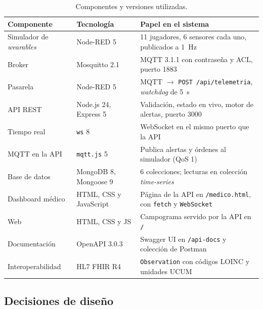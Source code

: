 \documentclass[runningheads]{llncs}
\begin{document}
\begin{table}[!htbp]
\centering
\caption{Componentes y versiones utilizadas.}\label{tab:tecnologias}
\footnotesize
\begin{tabularx}{\textwidth}{p{3.2cm}p{2.6cm}L}
\toprule
\textbf{Componente} & \textbf{Tecnología} & \textbf{Papel en el sistema} \\
\midrule
Simulador de \emph{wearables} & Node-RED 5 & 11 jugadores, 6 sensores cada uno, publicados a 1~Hz \\
Broker & Mosquitto 2.1 & MQTT 3.1.1 con contraseña y ACL, puerto 1883 \\
Pasarela & Node-RED 5 & MQTT $\rightarrow$ \texttt{POST /api/telemetria}, \emph{watchdog} de 5~s \\
API REST & Node.js 24, Express 5 & Validación, estado en vivo, motor de alertas, puerto 3000 \\
Tiempo real & \texttt{ws} 8 & WebSocket en el mismo puerto que la API \\
MQTT en la API & \texttt{mqtt.js} 5 & Publica alertas y órdenes al simulador (QoS 1) \\
Base de datos & MongoDB 8, Mongoose 9 & 6 colecciones; lecturas en colección \emph{time-series} \\
Dashboard médico & HTML, CSS y JavaScript & Página de la API en \texttt{/medico.html}, con \texttt{fetch} y \texttt{WebSocket} \\
Web & HTML, CSS y JS & Campograma servido por la API en \texttt{/} \\
Documentación & OpenAPI 3.0.3 & Swagger UI en \texttt{/api-docs} y colección de Postman \\
Interoperabilidad & HL7 FHIR R4 & \texttt{Observation} con códigos LOINC y unidades UCUM \\
\bottomrule
\end{tabularx}
\end{table}

\subsection{Decisiones de diseño}
\end{document}
